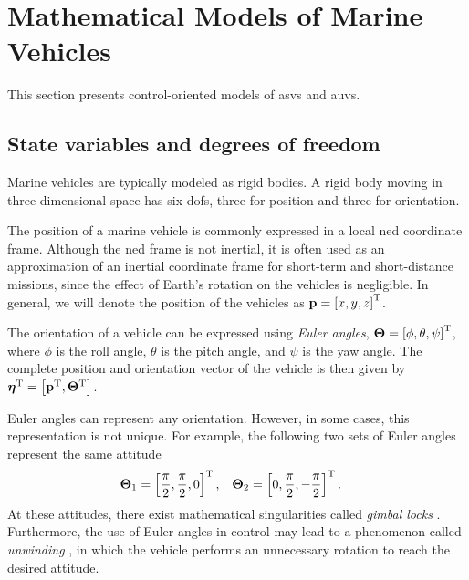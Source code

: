\section{Mathematical Models of Marine Vehicles}
\label{sec:model}

This section presents control-oriented models of \glspl{asv} and \glspl{auv}.

\subsection{State variables and degrees of freedom}
Marine vehicles are typically modeled as rigid bodies.
A rigid body moving in three-dimensional space has six \glspl{dof}, three for position and three for orientation.

The position of a marine vehicle is commonly expressed in a local \gls{ned} coordinate frame.
Although the \gls{ned} frame is not inertial, it is often used as an approximation of an inertial coordinate frame for short-term and short-distance missions, since the effect of Earth's rotation on the vehicles is negligible.
In general, we will denote the position of the vehicles as $\mathbf{p} = \left[x, y, z\right]^{\mathrm{T}}$.

The orientation of a vehicle can be expressed using \emph{Euler angles}, $\bm{\Theta} = \left[\phi, \theta, \psi\right]^{\mathrm{T}}$, where $\phi$ is the roll angle, $\theta$ is the pitch angle, and $\psi$ is the yaw angle.
The complete position and orientation vector of the vehicle is then given by $\bm{\eta}^{\mathrm{T}} = \left[\mathbf{p}^{\mathrm{T}}, \bm{\Theta}^{\mathrm{T}}\right]$.

Euler angles can represent any orientation.
However, in some cases, this representation is not unique.
For example, the following two sets of Euler angles represent the same attitude
\begin{align}
    \bm{\Theta}_1 &= \left[\frac{\pi}{2}, \frac{\pi}{2}, 0\right]^{\mathrm{T}}, &
    \bm{\Theta}_2 &= \left[0, \frac{\pi}{2}, -\frac{\pi}{2}\right]^{\mathrm{T}}. &
\end{align}
At these attitudes, there exist mathematical singularities called \emph{gimbal locks} \cite{chaturvedi_rigid-body_2011}.
Furthermore, the use of Euler angles in control may lead to a phenomenon called \emph{unwinding} \cite{sanjay_topological_2000}, in which the vehicle performs an unnecessary rotation to reach the desired attitude.

